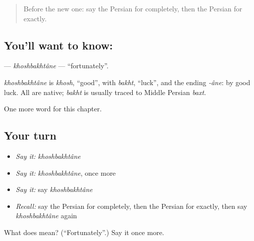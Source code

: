 \label{lesson:FA-C269-khoshbakhtane}



\begin{quote}
Before the new one: say the Persian for completely, then the Persian for exactly.
\end{quote}

\subsection*{You'll want to know: }
\textbf{} — \emph{khoshbakhtâne} — \textquotedblleft{}fortunately\textquotedblright{}.

\begin{cousinweb}
\emph{khoshbakhtâne} is \emph{khosh}, \textquotedblleft{}good\textquotedblright{}, with \emph{bakht}, \textquotedblleft{}luck\textquotedblright{}, and the ending \emph{-âne}: by good luck. All are native; \emph{bakht} is usually traced to Middle Persian \emph{baxt}.
\end{cousinweb}

\begin{grammarlens}[title={What you've built}]
One more word for this chapter.
\end{grammarlens}

\subsection*{Your turn}
\begin{itemize}
\raggedright
  \item \emph{Say it:} \emph{khoshbakhtâne}
  \item \emph{Say it:} \emph{khoshbakhtâne}, once more
  \item \emph{Say it:} say \emph{khoshbakhtâne}
  \item \emph{Recall:} say the Persian for completely, then the Persian for exactly, then say \emph{khoshbakhtâne} again
\end{itemize}

\begin{tcolorbox}[breakable,colback=teal!4,colframe=teal!35!black,title={Before you move on}]
What does  mean? (\textquotedblleft{}Fortunately\textquotedblright{}.) Say it once more.
\end{tcolorbox}
